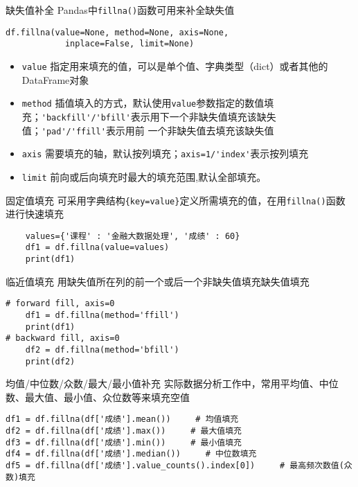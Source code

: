 \documentclass[t]{beamer}
\begin{document}
\begin{frame}[fragile]{缺失值补全}
Pandas中\verb|fillna()|函数可用来补全缺失值
\begin{lstlisting}
df.fillna(value=None, method=None, axis=None,
            inplace=False, limit=None)
\end{lstlisting}
\normalsize
\begin{itemize}
    \item \verb|value| 指定用来填充的值，可以是单个值、字典类型（dict）或者其他的DataFrame对象
    \item \verb|method|
    插值填入的方式，默认使用\verb|value|参数指定的数值填充；\verb|'backfill'/'bfill'|表示用下一个非缺失值填充该缺失值；\verb|'pad'/'ffill'|表示用前
    一个非缺失值去填充该缺失值
    \item \verb|axis| 需要填充的轴，默认按列填充；\verb|axis=1/'index'|表示按列填充
    \item \verb|limit| 前向或后向填充时最大的填充范围,默认全部填充。
\end{itemize}

\end{frame}



\begin{frame}[fragile]{固定值填充}
可采用字典结构\verb|{key=value}|定义所需填充的值，在用\verb|fillna()|函数进行快速填充

\begin{lstlisting}
    values={'课程' : '金融大数据处理', '成绩' : 60}
    df1 = df.fillna(value=values)
    print(df1)
\end{lstlisting}
\end{frame}


\begin{frame}[fragile]{临近值填充}
    用缺失值所在列的前一个或后一个非缺失值填充缺失值填充

\begin{lstlisting}
# forward fill, axis=0
    df1 = df.fillna(method='ffill') 
    print(df1)
# backward fill, axis=0
    df2 = df.fillna(method='bfill') 
    print(df2)
\end{lstlisting}

\end{frame}

\begin{frame}[fragile]{均值/中位数/众数/最大/最小值补充}
实际数据分析工作中，常用平均值、中位数、最大值、最小值、众位数等来填充空值

\begin{lstlisting}
df1 = df.fillna(df['成绩'].mean())     # 均值填充
df2 = df.fillna(df['成绩'].max())     # 最大值填充
df3 = df.fillna(df['成绩'].min())     # 最小值填充
df4 = df.fillna(df['成绩'].median())     # 中位数填充
df5 = df.fillna(df['成绩'].value_counts().index[0])     # 最高频次数值(众数)填充
\end{lstlisting}
\end{frame}
\end{document}
